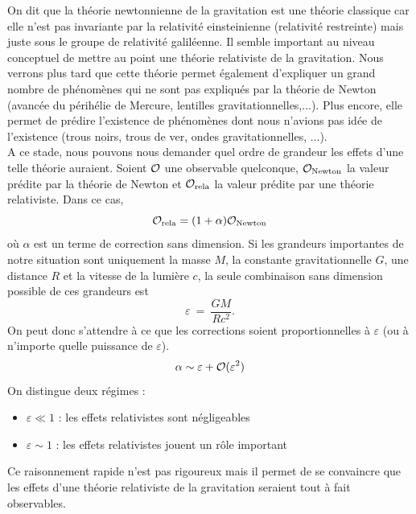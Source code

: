 \documentclass[a4paper,11pt]{report}
\begin{document}
        On dit que la théorie newtonnienne de la gravitation est une théorie classique car elle n'est pas invariante par la relativité einsteinienne (relativité restreinte) mais juste sous le groupe de relativité galiléenne. Il semble important au niveau conceptuel de mettre au point une théorie relativiste de la gravitation. Nous verrons plus tard que cette théorie permet également d'expliquer un grand nombre de phénomènes qui ne sont pas expliqués par la théorie de Newton (avancée du périhélie de Mercure, lentilles gravitationnelles,...). Plus encore, elle permet de prédire l'existence de phénomènes dont nous n'avions pas idée de l'existence (trous noirs, trous de ver, ondes gravitationnelles, ...).\\
        
        A ce stade, nous pouvons nous demander quel ordre de grandeur les effets d'une telle théorie auraient. Soient $\mathcal{O}$ une observable quelconque, $\mathcal{O}_{\text{Newton}}$ la valeur prédite par la théorie de Newton et $\mathcal{O}_{\text{rela}}$ la valeur prédite par une théorie relativiste. Dans ce cas,
        \begin{equation}
            \mathcal{O}_{\text{rela}} = (1+\alpha)\mathcal{O}_{\text{Newton}}
        \end{equation}
        où $\alpha$ est un terme de correction sans dimension. Si les grandeurs importantes de notre situation sont uniquement la masse $M$, la constante gravitationnelle $G$, une distance $R$ et la vitesse de la lumière $c$, la seule combinaison sans dimension possible de ces grandeurs est 
        \begin{equation}
            \varepsilon~\hat{=}~\frac{GM}{Rc^2}.
        \end{equation}
        On peut donc s'attendre à ce que les corrections soient proportionnelles à $\varepsilon$ (ou à n'importe quelle puissance de $\varepsilon$).
        \begin{equation}
            \alpha\sim\varepsilon+\mathcal{O}(\varepsilon^2)
        \end{equation}
        On distingue deux régimes :
        \begin{itemize}[label=\textbullet]
            \item $\varepsilon\ll 1$ : les effets relativistes sont négligeables
            \item $\varepsilon\sim 1$ : les effets relativistes jouent un rôle important
        \end{itemize}
        Ce raisonnement rapide n'est pas rigoureux mais il permet de se convaincre que les effets d'une théorie relativiste de la gravitation seraient tout à fait observables. 
\end{document}
